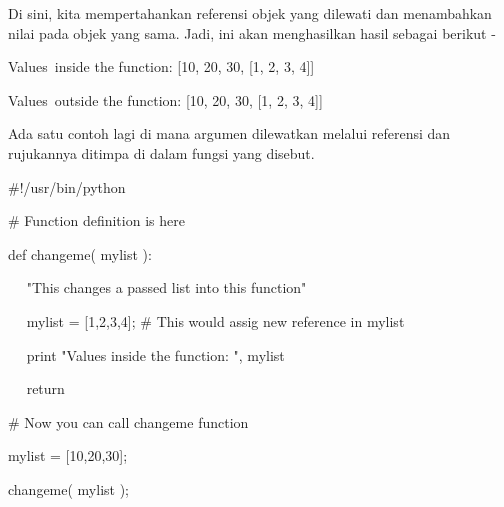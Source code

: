  \vspace{\baselineskip}
\noindent 
Di sini, kita mempertahankan referensi objek yang dilewati dan menambahkan nilai pada objek yang sama. Jadi, ini akan menghasilkan hasil sebagai berikut - \par
\vspace{\baselineskip}
\noindent 
 \hspace*{0.5in} Values~inside the function:  [10, 20, 30, [1, 2, 3, 4]] \par
\noindent 
 \hspace*{0.5in} Values~outside the function:  [10, 20, 30, [1, 2, 3, 4]] \par
\vspace{\baselineskip}
\noindent 
Ada satu contoh lagi di mana argumen dilewatkan melalui referensi dan rujukannya ditimpa di dalam fungsi yang disebut. \par
\vspace{\baselineskip}
\noindent 
 \hspace*{0.5in}  $  \#  $!/usr/bin/python \par
\vspace{12pt}
\noindent 
 \hspace*{0.5in}  $  \#  $ Function definition is here \par
\noindent 
 \hspace*{0.5in} def changeme( mylist ): \par
\vspace{\baselineskip}
\noindent 
 \hspace*{0.5in} ~~ "This changes a passed list into this function" \par
\noindent 
 \hspace*{0.5in} ~~ mylist = [1,2,3,4];  $  \#  $ This would assig new reference in mylist \par
\noindent 
 \hspace*{0.5in} ~~ print "Values inside the function: ", mylist \par
\noindent 
 \hspace*{0.5in} ~~ return \par
\vspace{12pt}
\noindent 
 \hspace*{0.5in}  $  \#  $ Now you can call changeme function \par
\noindent 
 \hspace*{0.5in} mylist = [10,20,30]; \par
 \vspace{\baselineskip}
\noindent 
 \hspace*{0.5in} changeme( mylist ); \par
